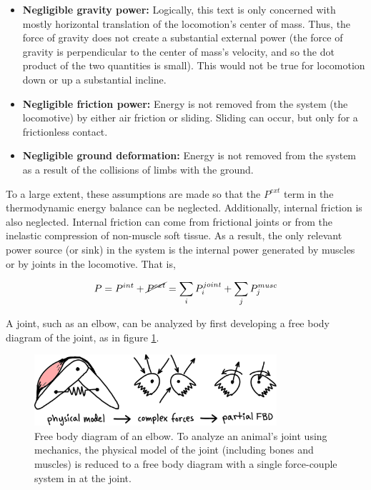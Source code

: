 \begin{itemize}
\item \textbf{Negligible gravity power:} Logically, this text is only concerned with mostly horizontal translation of the locomotion's center of mass. Thus, the force of gravity does not create a substantial external power (the force of gravity is perpendicular to the center of mass's velocity, and so the dot product of the two quantities is small). This would not be true for locomotion down or up a substantial incline.
\item \textbf{Negligible friction power:} Energy is not removed from the system (the locomotive) by either air friction or sliding. Sliding can occur, but only for a frictionless contact.
\item \textbf{Negligible ground deformation:} Energy is not removed from the system as a result of the collisions of limbs with the ground.
\end{itemize}

To a large extent, these assumptions are made so that the $P^{ext}$ term in the thermodynamic energy balance can be neglected. Additionally, internal friction is also neglected. Internal friction can come from frictional joints or from the inelastic compression of non-muscle soft tissue. As a result, the only relevant power source (or sink) in the system is the internal power generated by muscles or by joints in the locomotive. That is,

\begin{equation}
P = P^{int} + \cancel{P^{ext}} = \sum_{i} P_{i}^{joint} + \sum_{j} P_{j}^{musc}
\end{equation}

A joint, such as an elbow, can be analyzed by first developing a free body diagram of the joint, as in figure \ref{fig:ElbowFBD}.

%
\begin{figure}[h]		%
\begin{centering}
\includegraphics[width=0.8\textwidth]{Figures/ElbowFBD}\par
\end{centering}
\caption[Diagram: Free Body Diagram of an Elbow]{Free body diagram of an elbow. To analyze an animal's joint using mechanics, the physical model of the joint (including bones and muscles) is reduced to a free body diagram with a single force-couple system in at the joint.}
\label{fig:ElbowFBD}
\end{figure}
%

